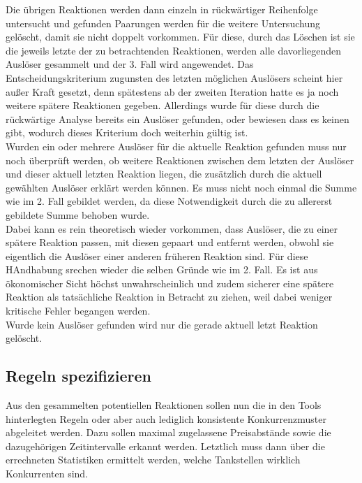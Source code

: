\documentclass[12pt,a4paper,bibliography=totocnumbered,listof=totocnumbered]{scrartcl}
\begin{document}
\begin{enumerate}
Die übrigen Reaktionen werden dann einzeln in rückwärtiger Reihenfolge untersucht und gefunden Paarungen werden für die weitere Untersuchung gelöscht, damit sie nicht doppelt vorkommen. Für diese, durch das Löschen ist sie die jeweils letzte der zu betrachtenden Reaktionen, werden alle davorliegenden Auslöser gesammelt und der 3. Fall wird angewendet. Das Entscheidungskriterium zugunsten des letzten möglichen Auslösers scheint hier außer Kraft gesetzt, denn spätestens ab der zweiten Iteration hatte es ja noch weitere spätere Reaktionen gegeben. Allerdings wurde für diese durch die rückwärtige Analyse bereits ein Auslöser gefunden, oder bewiesen dass es keinen gibt, wodurch dieses Kriterium doch weiterhin gültig ist.\\

Wurden ein oder mehrere Auslöser für die aktuelle Reaktion gefunden muss nur noch überprüft werden, ob weitere Reaktionen zwischen dem letzten der Auslöser und dieser aktuell letzten Reaktion liegen, die zusätzlich durch die aktuell gewählten Auslöser erklärt werden können. Es muss nicht noch einmal die Summe wie im 2. Fall gebildet werden, da diese Notwendigkeit durch die zu allererst gebildete Summe behoben wurde.\\

Dabei kann es rein theoretisch wieder vorkommen, dass Auslöser, die zu einer spätere Reaktion passen, mit diesen gepaart und entfernt werden, obwohl sie eigentlich die Auslöser einer anderen früheren Reaktion sind. Für diese HAndhabung srechen wieder die selben Gründe wie im 2. Fall. Es ist aus ökonomischer Sicht höchst unwahrscheinlich und zudem sicherer eine spätere Reaktion als tatsächliche Reaktion in Betracht zu ziehen, weil dabei weniger kritische Fehler begangen werden.\\
Wurde kein Auslöser gefunden wird nur die gerade aktuell letzt Reaktion gelöscht.
\end{enumerate}

\subsection{Regeln spezifizieren}
Aus den gesammelten potentiellen Reaktionen sollen nun die in den Tools hinterlegten Regeln oder aber auch lediglich konsistente Konkurrenzmuster abgeleitet werden. Dazu sollen maximal zugelassene Preisabstände sowie die dazugehörigen Zeitintervalle erkannt werden. Letztlich muss dann über die errechneten Statistiken ermittelt werden, welche Tankstellen wirklich Konkurrenten sind. 
\end{document}
